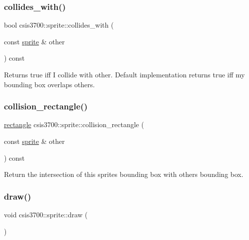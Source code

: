 \subsubsection{\texorpdfstring{collides\+\_\+with()}{collides\_with()}}
{\footnotesize\ttfamily bool csis3700\+::sprite\+::collides\+\_\+with (\begin{DoxyParamCaption}\item[{const \hyperlink{classcsis3700_1_1sprite}{sprite} \&}]{other }\end{DoxyParamCaption}) const\hspace{0.3cm}{\ttfamily [virtual]}}

Returns true iff I collide with other. Default implementation returns true iff my bounding box overlaps other\textquotesingle{}s. \mbox{\label{classcsis3700_1_1sprite_a54b72f8172133a7099ea2c73db23b4b2}} 
\subsubsection{\texorpdfstring{collision\+\_\+rectangle()}{collision\_rectangle()}}
{\footnotesize\ttfamily \hyperlink{classcsis3700_1_1rectangle}{rectangle} csis3700\+::sprite\+::collision\+\_\+rectangle (\begin{DoxyParamCaption}\item[{const \hyperlink{classcsis3700_1_1sprite}{sprite} \&}]{other }\end{DoxyParamCaption}) const\hspace{0.3cm}{\ttfamily [virtual]}}

Return the intersection of this sprite\textquotesingle{}s bounding box with other\textquotesingle{}s bounding box. \mbox{\label{classcsis3700_1_1sprite_a6a69657522664635f116e05648792555}} 
\subsubsection{\texorpdfstring{draw()}{draw()}}
{\footnotesize\ttfamily void csis3700\+::sprite\+::draw (\begin{DoxyParamCaption}{ }\end{DoxyParamCaption})\hspace{0.3cm}{\ttfamily [virtual]}}

